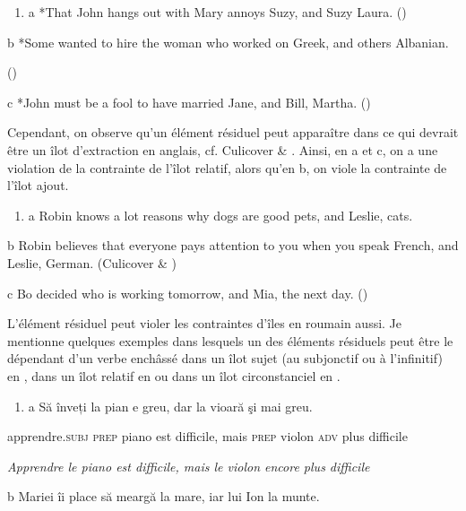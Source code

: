 \begin{enumerate}
\item \label{bkm:Ref289714791}a   *That John hangs out with Mary annoys Suzy, and Suzy Laura.  (\citet{Coppock2001})


\end{enumerate}
  b  *Some wanted to hire the woman who worked on Greek, and others Albanian. 

{\raggedleft
 (\citet{Merchant2009})
}

  c  *John must be a fool to have married Jane, and Bill, Martha.    (\citet{Coppock2001})

Cependant, on observe qu'un élément résiduel peut apparaître dans ce qui devrait être un îlot d'extraction en anglais, cf. Culicover \& \citet{Jackendoff2005}. Ainsi, en a et c, on a une violation de la contrainte de l'îlot relatif, alors qu'en b, on viole la contrainte de l'îlot ajout.


\begin{enumerate}
\item \label{bkm:Ref289716674}a   Robin knows a lot reasons why dogs are good pets, and Leslie, cats.  


\end{enumerate}
  b  Robin believes that everyone pays attention to you when you speak French, and Leslie, German.             (Culicover \& \citet{Jackendoff2005})

  c  Bo decided who is working tomorrow, and Mia, the next day.      (\citet{Chaves2005})

L'élément résiduel peut violer les contraintes d'îles en roumain aussi. Je mentionne quelques exemples dans lesquels un des éléments résiduels peut être le dépendant d'un verbe enchâssé dans un îlot sujet (au subjonctif ou à l'infinitif) en , dans un îlot relatif en  ou dans un îlot circonstanciel en .


\begin{enumerate}
\item \label{bkm:Ref289719791}a  Să înveți la pian e greu, dar la vioară şi mai greu.


\end{enumerate}
apprendre.\textsc{subj prep} piano est difficile, mais \textsc{prep} violon \textsc{adv} plus difficile

{\itshape
Apprendre le piano est difficile, mais le violon encore plus difficile}

  b  Mariei îi place să meargă la mare, iar lui Ion la munte.

